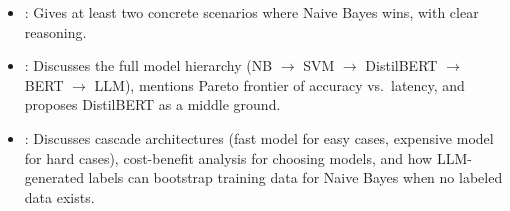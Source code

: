 \begin{interviewq}

\goodgreat
\begin{itemize}
    \item {}: Gives at least two concrete scenarios where Naive Bayes wins, with
    clear reasoning.
    \item {}: Discusses the full model hierarchy
    (NB $\to$ SVM $\to$ DistilBERT $\to$ BERT $\to$ LLM), mentions Pareto frontier of
    accuracy vs.\ latency, and proposes DistilBERT as a middle ground.
    \item {}: Discusses cascade architectures (fast model for easy cases,
    expensive model for hard cases), cost-benefit analysis for choosing models, and how
    LLM-generated labels can bootstrap training data for Naive Bayes when no labeled data
    exists.
\end{itemize}

\end{interviewq}

\vspace{0.5em}


